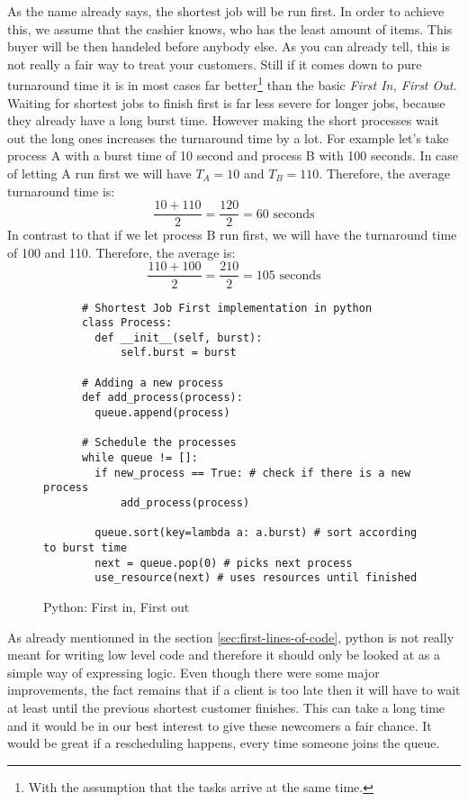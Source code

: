 As the name already says, the shortest job will be run first.
In order to achieve this, we assume that the cashier knows, who has the least amount of items.
This buyer will be then handeled before anybody else. As you can already tell, this is not really a fair way to treat your customers.
Still if it comes down to pure turnaround time it is in most cases far better\footnote{With the assumption that the tasks arrive at the same time.} than the basic \emph{First In, First Out}.
Waiting for shortest jobs to finish first is far less severe for longer jobs, because they already have a long burst time. However making the short processes wait out the long ones increases the turnaround time by a lot.
For example let's take process A with a burst time of 10 second and process B with 100 seconds. In case of letting A run first we will have $T_A = 10$ and $T_B = 110$.
Therefore, the average turnaround time is:
$$\frac{10 + 110}{2} = \frac{120}{2} = 60 \text{ seconds}$$
In contrast to that if we let process B run first, we will have the turnaround time of 100 and 110. Therefore, the average is:
$$\frac{110 + 100}{2} = \frac{210}{2} = 105 \text{ seconds}$$



\begin{figure}[h]
    \begin{verbatim}
      # Shortest Job First implementation in python
      class Process:
        def __init__(self, burst):
            self.burst = burst

      # Adding a new process
      def add_process(process):
        queue.append(process)

      # Schedule the processes
      while queue != []:
        if new_process == True: # check if there is a new process
            add_process(process)
        
        queue.sort(key=lambda a: a.burst) # sort according to burst time
        next = queue.pop(0) # picks next process
        use_resource(next) # uses resources until finished
    \end{verbatim}
    \caption{Python: First in, First out}
    \label{code:sjf}
\end{figure}

As already mentionned in the section \ref{sec:first-lines-of-code}, python is not really meant for writing low level code and therefore it should only be looked at as a simple way of expressing logic.
Even though there were some major improvements, the fact remains that if a client is too late then it will have to wait at least  until the previous shortest customer finishes. This can take a long time and it would be in our best interest to give these newcomers a fair chance. 
It would be great if a rescheduling happens, every time someone joins the queue.

